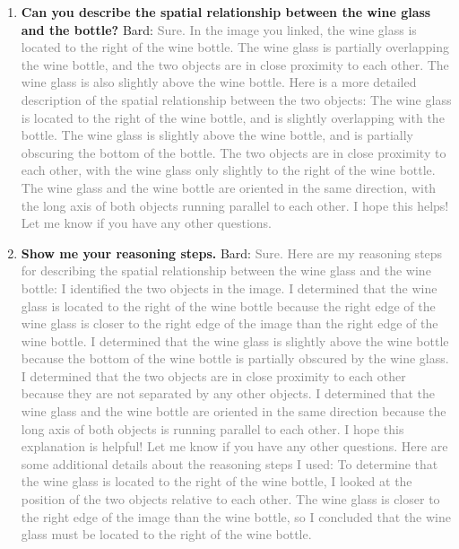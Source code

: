     \begin{enumerate}
        \item \textbf{Can you describe the spatial relationship between the wine glass and the bottle?}
        \subitem Bard: \textcolor{gray}{
        Sure. In the image you linked, the wine glass is located to the right of the wine bottle. The wine glass is partially overlapping the wine bottle, and the two objects are in close proximity to each other. The wine glass is also slightly above the wine bottle.
        Here is a more detailed description of the spatial relationship between the two objects:
        The wine glass is located to the right of the wine bottle, and is slightly overlapping with the bottle.
        The wine glass is slightly above the wine bottle, and is partially obscuring the bottom of the bottle.
        The two objects are in close proximity to each other, with the wine glass only slightly to the right of the wine bottle.
        The wine glass and the wine bottle are oriented in the same direction, with the long axis of both objects running parallel to each other.
        I hope this helps! Let me know if you have any other questions.}
        \item \textbf{Show me your reasoning steps.}
        \subitem Bard: \textcolor{gray}{Sure. Here are my reasoning steps for describing the spatial relationship between the wine glass and the wine bottle:
        I identified the two objects in the image.
        I determined that the wine glass is located to the right of the wine bottle because the right edge of the wine glass is closer to the right edge of the image than the right edge of the wine bottle.
        I determined that the wine glass is slightly above the wine bottle because the bottom of the wine bottle is partially obscured by the wine glass.
        I determined that the two objects are in close proximity to each other because they are not separated by any other objects.
        I determined that the wine glass and the wine bottle are oriented in the same direction because the long axis of both objects is running parallel to each other.
        I hope this explanation is helpful! Let me know if you have any other questions.
        Here are some additional details about the reasoning steps I used:
        To determine that the wine glass is located to the right of the wine bottle, I looked at the position of the two objects relative to each other. The wine glass is closer to the right edge of the image than the wine bottle, so I concluded that the wine glass must be located to the right of the wine bottle.
}
\end{enumerate}
